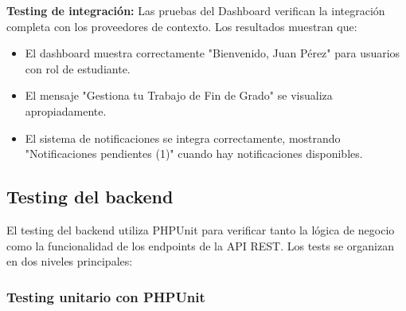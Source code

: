 \documentclass[12pt,a4paper,oneside]{report}
\begin{document}
\textbf{Testing de integración:} Las pruebas del Dashboard verifican la integración completa con los proveedores de contexto. Los resultados muestran que:
\begin{itemize}
\item El dashboard muestra correctamente "Bienvenido, Juan Pérez" para usuarios con rol de estudiante.
\item El mensaje "Gestiona tu Trabajo de Fin de Grado" se visualiza apropiadamente.
\item El sistema de notificaciones se integra correctamente, mostrando "Notificaciones pendientes (1)" cuando hay notificaciones disponibles.
\end{itemize}

\subsection{Testing del backend}\label{testing-del-backend}

El testing del backend utiliza PHPUnit para verificar tanto la lógica de negocio como la funcionalidad de los endpoints de la API REST. Los tests se organizan en dos niveles principales:

\subsubsection{Testing unitario con
PHPUnit}\label{testing-unitario-con-phpunit}
\end{document}
